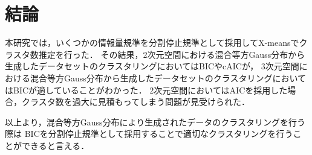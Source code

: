 \section{結論}

本研究では，いくつかの情報量規準を分割停止規準として採用してX-meansでクラスタ数推定を行った．
その結果，2次元空間における混合等方Gauss分布から生成したデータセットのクラスタリングにおいてはBICやcAICが，
3次元空間における混合等方Gauss分布から生成したデータセットのクラスタリングにおいてはBICが適していることがわかった．
2次元空間においてはAICを採用した場合，クラスタ数を過大に見積もってしまう問題が見受けられた．

以上より，混合等方Gauss分布により生成されたデータのクラスタリングを行う際は
BICを分割停止規準として採用することで適切なクラスタリングを行うことができると言える．

